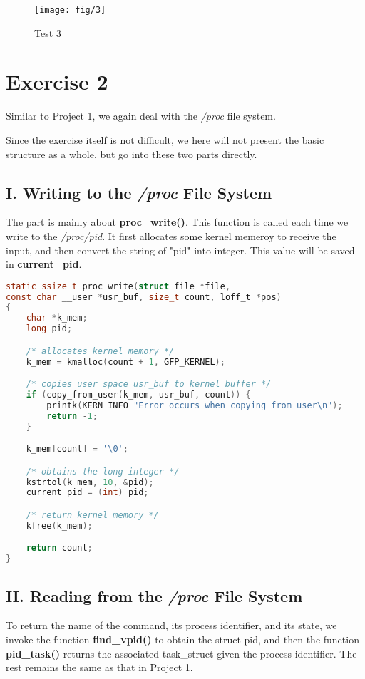 \documentclass{article}
\begin{document}
\begin{figure}[h]
    \centering
    
    \texttt{[image: fig/3]}
    \caption{Test 3}
    \label{3}
\end{figure}


\section*{Exercise 2}
Similar to Project 1, we again deal with the \textit{/proc} file system. 

Since the exercise itself is not difficult, we here will not present the basic structure as a whole, but go into these two parts directly.

\subsection*{I. Writing to the \textit{/proc} File System}
The part is mainly about \textbf{proc\_write()}. This function is called each time we write to the \textit{/proc/pid}. It first allocates some kernel memeroy to receive the input, and then convert the string of "pid" into integer. This value will be saved in \textbf{current\_pid}. 

\begin{lstlisting}[language=c, caption={proc\_read()}, captionpos=b]
static ssize_t proc_write(struct file *file,
const char __user *usr_buf, size_t count, loff_t *pos)
{
    char *k_mem;
    long pid;

    /* allocates kernel memory */
    k_mem = kmalloc(count + 1, GFP_KERNEL);

    /* copies user space usr_buf to kernel buffer */
    if (copy_from_user(k_mem, usr_buf, count)) {
        printk(KERN_INFO "Error occurs when copying from user\n");
        return -1;
    }

    k_mem[count] = '\0';

    /* obtains the long integer */
    kstrtol(k_mem, 10, &pid);
    current_pid = (int) pid;

    /* return kernel memory */
    kfree(k_mem);

    return count;
}
\end{lstlisting}

\subsection*{II. Reading from the \textit{/proc} File System}
To return the name of the command, its process identifier, and its state, we invoke the function \textbf{find\_vpid()} to obtain the struct pid, and then the function \textbf{pid\_task()} returns the associated
task\_struct given the process identifier. The rest remains the same as that in Project 1.
\end{document}
